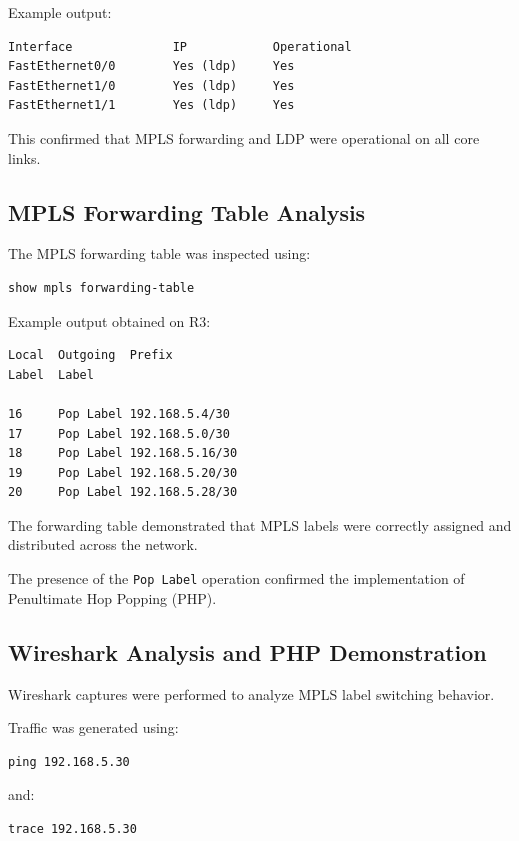 \documentclass[12pt]{article}
\begin{document}
Example output:

\begin{lstlisting}
Interface              IP            Operational
FastEthernet0/0        Yes (ldp)     Yes
FastEthernet1/0        Yes (ldp)     Yes
FastEthernet1/1        Yes (ldp)     Yes
\end{lstlisting}

This confirmed that MPLS forwarding and LDP were operational on all core links.

\subsection{MPLS Forwarding Table Analysis}

The MPLS forwarding table was inspected using:

\begin{lstlisting}
show mpls forwarding-table
\end{lstlisting}

Example output obtained on R3:

\begin{lstlisting}
Local  Outgoing  Prefix
Label  Label

16     Pop Label 192.168.5.4/30
17     Pop Label 192.168.5.0/30
18     Pop Label 192.168.5.16/30
19     Pop Label 192.168.5.20/30
20     Pop Label 192.168.5.28/30
\end{lstlisting}

The forwarding table demonstrated that MPLS labels were correctly assigned and distributed across the network.

The presence of the \texttt{Pop Label} operation confirmed the implementation of Penultimate Hop Popping (PHP).

\subsection{Wireshark Analysis and PHP Demonstration}

Wireshark captures were performed to analyze MPLS label switching behavior.

Traffic was generated using:

\begin{lstlisting}
ping 192.168.5.30
\end{lstlisting}

and:

\begin{lstlisting}
trace 192.168.5.30
\end{lstlisting}
\end{document}
